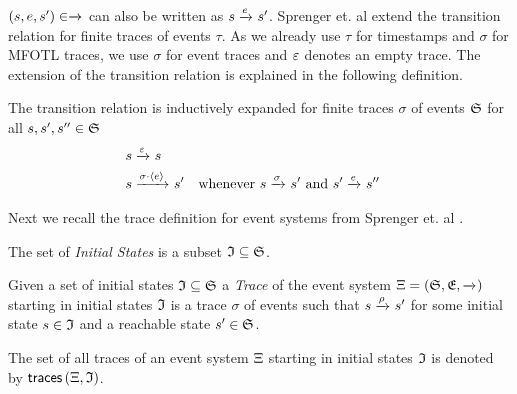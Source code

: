 $(s,e,s') \in \xrightarrow{}_{}$ can also be written as
$s \xrightarrow{e}_{} s'$.
Sprenger et. al \cite{igloo} extend the transition relation for finite traces of events
$\tau$. As we already use $\tau$ for timestamps and $\sigma$ for MFOTL traces, we
use $\sigma$ for event traces and  $\varepsilon$ denotes an empty trace.
The extension of the transition relation is explained in the following definition.

\begin{definition}
    \label{def:transition-relation-extension}
    The transition relation is inductively expanded for finite traces $\sigma$
    of events $\mathfrak{S}$ for all
    $s,s',s'' \in \mathfrak{S}$
    \begin{align}
        s &\xrightarrow{\varepsilon}_{} s \\
        s &\xrightarrow{\sigma \cdot \left\langle e \right\rangle}_{} s'
        && \text{whenever } 
        s \xrightarrow{\sigma}_{} s' \text{ and }
        s' \xrightarrow{e}_{} s''
    \end{align}
\end{definition}

Next we recall the trace definition for event systems from Sprenger et. al
\cite{igloo}.

\begin{definition}
    \label{def:event-system-initial-states}
    The set of \emph{Initial States} is a subset
    $\mathfrak{I} \subseteq \mathfrak{S}$.
\end{definition}

\begin{definition}
    \label{def:event-system-trace}
    Given a set of initial states $\mathfrak{I} \subseteq \mathfrak{S}$
    a \emph{Trace} of the event system
    $\Xi = \left(\mathfrak{S}, \mathfrak{E}, \xrightarrow{}_{} \right)$
    starting in initial states $\mathfrak{I}$ is a trace $\sigma$ of events
    such that $s \xrightarrow{\rho}_{} s'$ for some initial state
    $s \in \mathfrak{I}$ and a reachable state $s' \in \mathfrak{S}$.
\end{definition}

The set of all traces of an event system $\Xi$ starting in initial states
$\mathfrak{I}$ is denoted by $\mathsf{traces}\left(\Xi, \mathfrak{I} \right)$.

